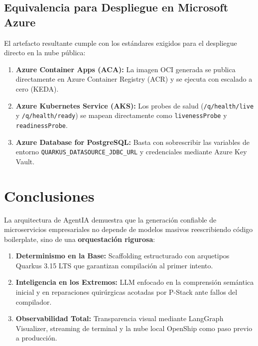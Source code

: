 \documentclass[11pt,a4paper]{report}
\begin{document}
\section{Equivalencia para Despliegue en Microsoft Azure}
El artefacto resultante cumple con los estándares exigidos para el despliegue directo en la nube pública:
\begin{enumerate}
    \item \textbf{Azure Container Apps (ACA):} La imagen OCI generada se publica directamente en Azure Container Registry (ACR) y se ejecuta con escalado a cero (KEDA).
    \item \textbf{Azure Kubernetes Service (AKS):} Los probes de salud (\texttt{/q/health/live} y \texttt{/q/health/ready}) se mapean directamente como \texttt{livenessProbe} y \texttt{readinessProbe}.
    \item \textbf{Azure Database for PostgreSQL:} Basta con sobrescribir las variables de entorno \texttt{QUARKUS\_DATASOURCE\_JDBC\_URL} y credenciales mediante Azure Key Vault.
\end{enumerate}

\chapter*{Conclusiones}
La arquitectura de AgentIA demuestra que la generación confiable de microservicios empresariales no depende de modelos masivos reescribiendo código boilerplate, sino de una \textbf{orquestación rigurosa}:
\begin{enumerate}
    \item \textbf{Determinismo en la Base:} Scaffolding estructurado con arquetipos Quarkus 3.15 LTS que garantizan compilación al primer intento.
    \item \textbf{Inteligencia en los Extremos:} LLM enfocado en la comprensión semántica inicial y en reparaciones quirúrgicas acotadas por P-Stack ante fallos del compilador.
    \item \textbf{Observabilidad Total:} Transparencia visual mediante LangGraph Visualizer, streaming de terminal y la nube local OpenShip como paso previo a producción.
\end{enumerate}
\end{document}
